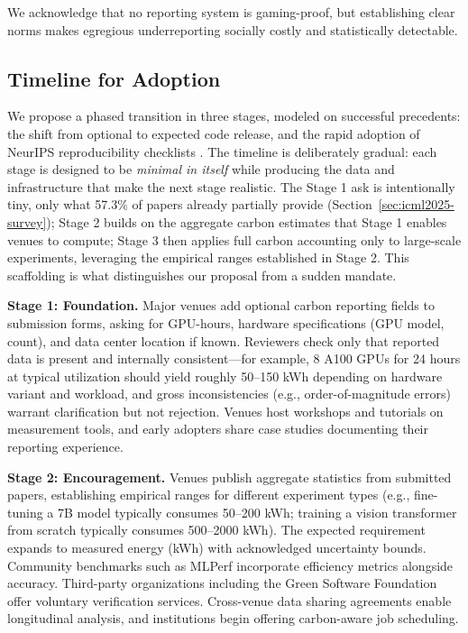\documentclass{article}
\theoremstyle{plain}
\theoremstyle{definition}
\theoremstyle{remark}
\begin{document}
We acknowledge that no reporting system is gaming-proof, but establishing clear norms makes egregious underreporting socially costly and statistically detectable.

\subsection{Timeline for Adoption}
\label{sec:timeline}

We propose a phased transition in three stages, modeled on successful precedents: the shift from optional to expected code release, and the rapid adoption of NeurIPS reproducibility checklists \cite{pineau2021improving}. The timeline is deliberately gradual: each stage is designed to be \emph{minimal in itself} while producing the data and infrastructure that make the next stage realistic. The Stage 1 ask is intentionally tiny, only what 57.3\% of papers already partially provide (Section~\ref{sec:icml2025-survey}); Stage 2 builds on the aggregate carbon estimates that Stage 1 enables venues to compute; Stage 3 then applies full carbon accounting only to large-scale experiments, leveraging the empirical ranges established in Stage 2. This scaffolding is what distinguishes our proposal from a sudden mandate.

\textbf{Stage 1: Foundation.} Major venues add optional carbon reporting fields to submission forms, asking for GPU-hours, hardware specifications (GPU model, count), and data center location if known. Reviewers check only that reported data is present and internally consistent---for example, 8 A100 GPUs for 24 hours at typical utilization should yield roughly 50--150 kWh depending on hardware variant and workload, and gross inconsistencies (e.g., order-of-magnitude errors) warrant clarification but not rejection. Venues host workshops and tutorials on measurement tools, and early adopters share case studies documenting their reporting experience.

\textbf{Stage 2: Encouragement.} Venues publish aggregate statistics from submitted papers, establishing empirical ranges for different experiment types (e.g., fine-tuning a 7B model typically consumes 50--200 kWh; training a vision transformer from scratch typically consumes 500--2000 kWh). The expected requirement expands to measured energy (kWh) with acknowledged uncertainty bounds. Community benchmarks such as MLPerf incorporate efficiency metrics alongside accuracy. Third-party organizations including the Green Software Foundation offer voluntary verification services. Cross-venue data sharing agreements enable longitudinal analysis, and institutions begin offering carbon-aware job scheduling.
\end{document}
